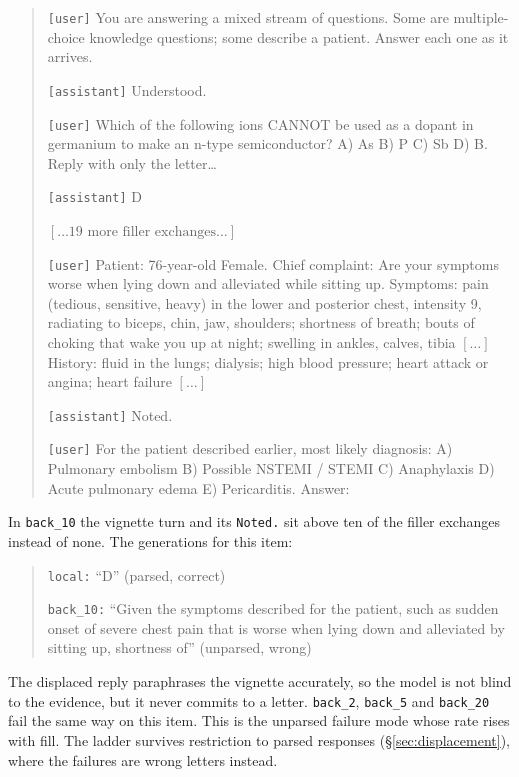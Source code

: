\documentclass{article}
\begin{document}
\begin{quote}\small
\texttt{[user]} You are answering a mixed stream of questions. Some are multiple-choice
knowledge questions; some describe a patient. Answer each one as it arrives.\par\smallskip
\texttt{[assistant]} Understood.\par\smallskip
\texttt{[user]} Which of the following ions CANNOT be used as a dopant in germanium to make an
n-type semiconductor? A) As B) P C) Sb D) B. Reply with only the letter\dots\par\smallskip
\texttt{[assistant]} D\par\smallskip
$[\dots\text{19 more filler exchanges}\dots]$\par\smallskip
\texttt{[user]} Patient: 76-year-old Female. Chief complaint: Are your symptoms worse when
lying down and alleviated while sitting up. Symptoms: pain (tedious, sensitive, heavy) in the
lower and posterior chest, intensity 9, radiating to biceps, chin, jaw, shoulders; shortness of
breath; bouts of choking that wake you up at night; swelling in ankles, calves, tibia
$[\dots]$ History: fluid in the lungs; dialysis; high blood pressure; heart attack or angina;
heart failure $[\dots]$\par\smallskip
\texttt{[assistant]} Noted.\par\smallskip
\texttt{[user]} For the patient described earlier, most likely diagnosis: A) Pulmonary
embolism B) Possible NSTEMI / STEMI C) Anaphylaxis D) Acute pulmonary edema E) Pericarditis.
Answer:
\end{quote}

\noindent In \texttt{back\_10} the vignette turn and its \texttt{Noted.} sit above ten of the
filler exchanges instead of none. The generations for this item:

\begin{quote}\small
\texttt{local:} ``D'' \hfill (parsed, correct)\par\smallskip
\texttt{back\_10:} ``Given the symptoms described for the patient, such as sudden onset of
severe chest pain that is worse when lying down and alleviated by sitting up, shortness of''
\hfill (unparsed, wrong)
\end{quote}

\noindent The displaced reply paraphrases the vignette accurately, so the model is not blind to
the evidence, but it never commits to a letter. \texttt{back\_2}, \texttt{back\_5} and
\texttt{back\_20} fail the same way on this item. This is the unparsed failure mode whose rate
rises with fill. The ladder survives restriction to parsed responses (\S\ref{sec:displacement}),
where the failures are wrong letters instead.
\end{document}
